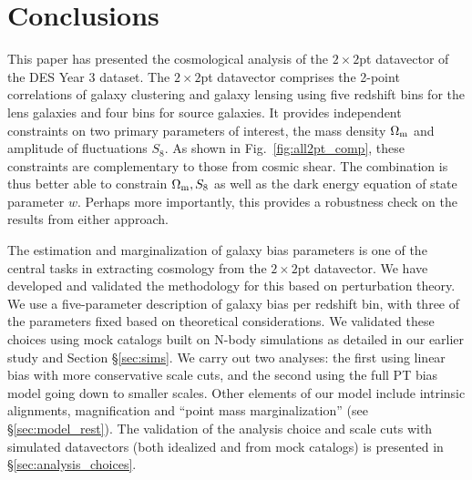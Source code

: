 \documentclass[aps, prd,twocolumn,superscriptaddress,nofootinbib,preprintnumbers]{revtex4-1}
\begin{document}


\section{Conclusions}

This paper has presented the cosmological analysis of the $2\times2$pt datavector of the DES Year 3 dataset. The $2\times2$pt datavector comprises the 2-point correlations of galaxy clustering and galaxy lensing using five redshift bins for the lens galaxies and four bins for source galaxies. It provides independent constraints on two primary parameters of interest, the mass density $\Omega_{\rm m}$ and amplitude of fluctuations $S_8$. As shown in Fig.~\ref{fig:all2pt_comp}, these constraints are complementary to those from cosmic shear. The combination is thus better able to constrain $\Omega_{\rm m}, S_8$ as well as the dark energy equation of state parameter $w$. Perhaps more importantly, this provides a robustness check on the results from either approach. 

The estimation and marginalization of galaxy bias parameters is one of the central tasks in extracting cosmology from the $2\times2$pt datavector. We have developed and validated the methodology for this based on perturbation theory. We use a five-parameter description of galaxy bias per redshift bin, with three of the parameters fixed based on theoretical considerations. We validated these choices using mock catalogs built on N-body simulations as detailed in our earlier study \citep{p2020perturbation} and Section \S\ref{sec:sims}.  
We carry out two analyses: the first using linear bias with more conservative scale cuts, and the second using the full PT bias model going down to smaller scales. Other  elements of our model include intrinsic alignments, magnification and ``point mass marginalization'' (see \S\ref{sec:model_rest}). The validation of the analysis choice and scale cuts with simulated datavectors (both idealized and from mock catalogs) is presented in \S\ref{sec:analysis_choices}. 
\end{document}
